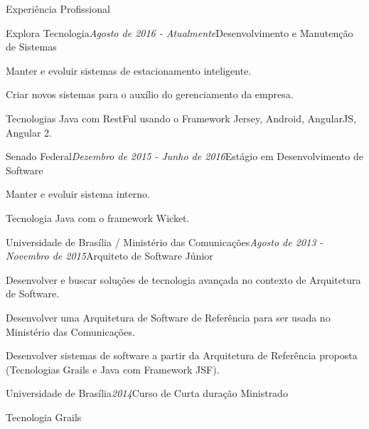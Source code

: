 \documentclass{resume} %
\begin{document}
\begin{rSection}{Experiência Profissional}

\begin{rSubsection}{Explora Tecnologia}{\em Agosto de 2016 - Atualmente}{Desenvolvimento e Manutenção de Sistemas}{}
\item Manter e evoluir sistemas de estacionamento inteligente.
\item Criar novos sistemas para o auxílio do gerenciamento da empresa.
\item Tecnologias Java com RestFul usando o Framework Jersey, Android, AngularJS, Angular 2.
\end{rSubsection}

\begin{rSubsection}{Senado Federal}{\em Dezembro de 2015 - Junho de 2016}{Estágio em Desenvolvimento de Software}{}
\item Manter e evoluir sistema interno.
\item Tecnologia Java com o framework Wicket.
\end{rSubsection}

\begin{rSubsection}{Universidade de Brasília / Ministério das Comunicações}{\em Agosto de 2013 - Novembro de 2015}{Arquiteto de Software Júnior}{}
\item Desenvolver e buscar soluções de tecnologia avançada no contexto de Arquitetura de
Software.
\item Desenvolver uma Arquitetura de Software de Referência para ser usada no Ministério
das Comunicações.
\item Desenvolver sistemas de software a partir da Arquitetura de Referência proposta (Tecnologias Grails e Java com Framework JSF).
\end{rSubsection}


\begin{rSubsection}{Universidade de Brasília}{\em 2014}{Curso de Curta duração Ministrado}{}
\item Tecnologia Grails
\end{rSubsection}

\end{rSection}

\end{document}
